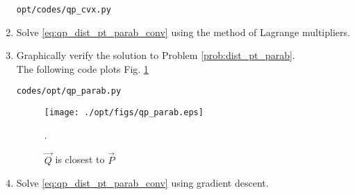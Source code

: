 \begin{enumerate}[label=\thesection.\arabic*.,ref=\thesection.\theenumi]
\begin{lstlisting}
opt/codes/qp_cvx.py
\end{lstlisting}

\item Solve \eqref{eq:qp_dist_pt_parab_conv} using the method of Lagrange multipliers.
\item Graphically verify the solution to Problem \ref{prob:dist_pt_parab}. 
\\
\solution 
The following code plots Fig. \ref{fig:qp_parab}
%	
\begin{lstlisting}
codes/opt/qp_parab.py
\end{lstlisting}

%
\begin{figure}[!ht]
\centering
\texttt{[image: ./opt/figs/qp\_parab.eps]}
\caption{ $\vec{Q}$ is closest to $\vec{P}$}.
\label{fig:qp_parab}
\end{figure}
%
%
%	
\item Solve \eqref{eq:qp_dist_pt_parab_conv} using gradient descent.
%
\end{enumerate}
